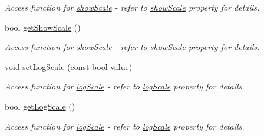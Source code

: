 \begin{DoxyCompactItemize}
\begin{DoxyCompactList}\small\item\em Access function for \hyperlink{classQEAnalogIndicator_a5566b124bcc23b20c784490ebb5e0095}{showScale} -\/ refer to \hyperlink{classQEAnalogIndicator_a5566b124bcc23b20c784490ebb5e0095}{showScale} property for details. \end{DoxyCompactList}\item 
\hypertarget{classQEAnalogIndicator_aee6289ce3e36c51a1db5c8f9775f710d}{
bool \hyperlink{classQEAnalogIndicator_aee6289ce3e36c51a1db5c8f9775f710d}{getShowScale} ()}
\label{classQEAnalogIndicator_aee6289ce3e36c51a1db5c8f9775f710d}

\begin{DoxyCompactList}\small\item\em Access function for \hyperlink{classQEAnalogIndicator_a5566b124bcc23b20c784490ebb5e0095}{showScale} -\/ refer to \hyperlink{classQEAnalogIndicator_a5566b124bcc23b20c784490ebb5e0095}{showScale} property for details. \end{DoxyCompactList}\item 
\hypertarget{classQEAnalogIndicator_a373c22f941c5127f115dde43165a4e3f}{
void \hyperlink{classQEAnalogIndicator_a373c22f941c5127f115dde43165a4e3f}{setLogScale} (const bool value)}
\label{classQEAnalogIndicator_a373c22f941c5127f115dde43165a4e3f}

\begin{DoxyCompactList}\small\item\em Access function for \hyperlink{classQEAnalogIndicator_ad68533fcf52035397d9fb01086ab957c}{logScale} -\/ refer to \hyperlink{classQEAnalogIndicator_ad68533fcf52035397d9fb01086ab957c}{logScale} property for details. \end{DoxyCompactList}\item 
\hypertarget{classQEAnalogIndicator_a11e68230113fb818abdc772227e3574b}{
bool \hyperlink{classQEAnalogIndicator_a11e68230113fb818abdc772227e3574b}{getLogScale} ()}
\label{classQEAnalogIndicator_a11e68230113fb818abdc772227e3574b}

\begin{DoxyCompactList}\small\item\em Access function for \hyperlink{classQEAnalogIndicator_ad68533fcf52035397d9fb01086ab957c}{logScale} -\/ refer to \hyperlink{classQEAnalogIndicator_ad68533fcf52035397d9fb01086ab957c}{logScale} property for details. \end{DoxyCompactList}\end{DoxyCompactItemize}
